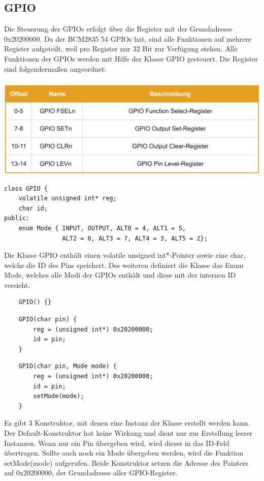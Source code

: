 \documentclass[12pt]{article}
\begin{document}
\subsection{GPIO}
Die Steuerung der GPIOs erfolgt über die Register mit der Grundadresse 0x20200000. Da der BCM2835 54 GPIOs hat, sind alle Funktionen auf mehrere Register aufgeteilt, weil pro Register nur 32 Bit zur Verfügung stehen. Alle Funktionen der GPIOs werden mit Hilfe der Klasse GPIO gesteuert. Die Register sind folgendermaßen angeordnet:\\\\
\includegraphics[width=\textwidth]{img/gpio_table.png}
\begin{center}\end{center}
\begin{verbatim}
class GPIO {
    volatile unsigned int* reg;
    char id;
public:
    enum Mode { INPUT, OUTPUT, ALT0 = 4, ALT1 = 5, 
                ALT2 = 6, ALT3 = 7, ALT4 = 3, ALT5 = 2};
\end{verbatim} 
Die Klasse GPIO enthält einen volatile unsigned int*-Pointer sowie eine char, welche die ID des Pins speichert. Des weiteren definiert die Klasse das Enum Mode, welches alle Modi der GPIOs enthält und diese mit der internen ID versieht.\\
\begin{verbatim}
    GPIO() {}
\end{verbatim}
\begin{verbatim}
    GPIO(char pin) {
        reg = (unsigned int*) 0x20200000;
        id = pin;
    }
\end{verbatim}
\begin{verbatim}
    GPIO(char pin, Mode mode) {
        reg = (unsigned int*) 0x20200000;
        id = pin;
        setMode(mode);
    }
\end{verbatim}
Es gibt 3 Konstruktor, mit denen eine Instanz der Klasse erstellt werden kann. Der Default-Konstruktor hat keine Wirkung und dient nur zur Erstellung leerer Instanzen. Wenn nur ein Pin übergeben wird, wird dieser in das ID-Feld übertragen. Sollte auch noch ein Mode übergeben werden, wird die Funktion setMode(mode) aufgerufen. Beide Konstruktor setzen die Adresse des Pointers auf 0x20200000, der Grundadresse aller GPIO-Register.\\\\\\
\end{document}
